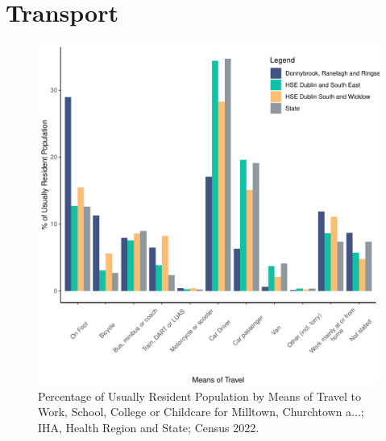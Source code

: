 \documentclass{article}
\begin{document}
\section{Transport}\label{sect:Trans}
\begin{figure}[H]
	\centering
	\includegraphics[width = 120mm]{../figures/TravelED.pdf}
	\caption{Percentage of Usually Resident Population by Means of Travel to Work, School, College or Childcare for Milltown, Churchtown a...; IHA, Health Region and State; Census 2022.}
	\label{fig:vbnv}
	\end{figure}
\end{document}
